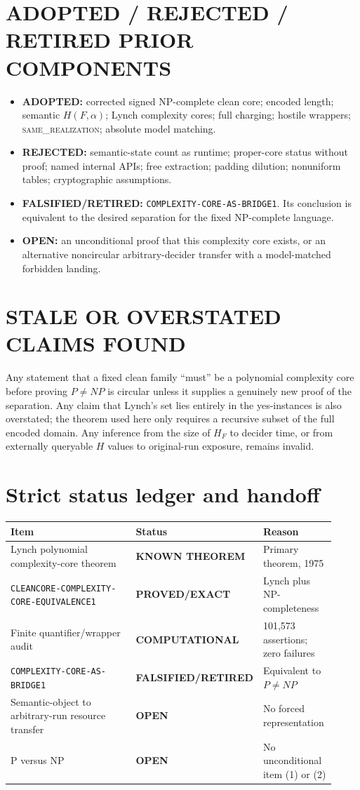 \documentclass[11pt]{article}
\newcommand{\OPEN}{\textbf{OPEN}}
\newcommand{\EXACT}{\textbf{PROVED/EXACT}}
\newcommand{\KNOWN}{\textbf{KNOWN THEOREM}}
\newcommand{\COMP}{\textbf{COMPUTATIONAL}}
\newcommand{\RETIRED}{\textbf{FALSIFIED/RETIRED}}
\begin{document}
\section{ADOPTED / REJECTED / RETIRED PRIOR COMPONENTS}
\begin{itemize}[leftmargin=*]
\item \textbf{ADOPTED:} corrected signed NP-complete clean core; encoded
length; semantic \(H(F,\alpha)\); Lynch complexity cores; full charging;
hostile wrappers; \textsc{same\_realization}; absolute model matching.
\item \textbf{REJECTED:} semantic-state count as runtime; proper-core status
without proof; named internal APIs; free extraction; padding dilution;
nonuniform tables; cryptographic assumptions.
\item \textbf{FALSIFIED/RETIRED:}
\texttt{COMPLEXITY-CORE-AS-BRIDGE1}.  Its conclusion is equivalent to the
desired separation for the fixed NP-complete language.
\item \textbf{OPEN:} an unconditional proof that this complexity core exists,
or an alternative noncircular arbitrary-decider transfer with a
model-matched forbidden landing.
\end{itemize}

\section{STALE OR OVERSTATED CLAIMS FOUND}
Any statement that a fixed clean family ``must'' be a polynomial complexity
core before proving \(P\ne NP\) is circular unless it supplies a genuinely
new proof of the separation.  Any claim that Lynch's set lies entirely in the
yes-instances is also overstated; the theorem used here only requires a
recursive subset of the full encoded domain.  Any inference from the size of
\(H_F\) to decider time, or from externally queryable \(H\) values to
original-run exposure, remains invalid.

\section{Strict status ledger and handoff}
\begin{center}
\begin{tabular}{p{0.49\linewidth}p{0.20\linewidth}p{0.23\linewidth}}
\toprule
Item & Status & Reason \\
\midrule
Lynch polynomial complexity-core theorem & \KNOWN & Primary theorem, 1975\\
\texttt{CLEANCORE-COMPLEXITY-CORE-EQUIVALENCE1} & \EXACT & Lynch plus NP-completeness\\
Finite quantifier/wrapper audit & \COMP & 101,573 assertions; zero failures\\
\texttt{COMPLEXITY-CORE-AS-BRIDGE1} & \RETIRED & Equivalent to \(P\ne NP\)\\
Semantic-object to arbitrary-run resource transfer & \OPEN & No forced representation\\
P versus NP & \OPEN & No unconditional item (1) or (2)\\
\bottomrule
\end{tabular}
\end{center}
\end{document}
